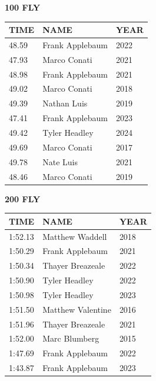 \begin{table}[H]
\centering
\begin{minipage}[t]{0.48\textwidth}
\centering
\textbf{100 FLY}\\[0.1cm]
\begin{tabular}{@{}p{1.8cm}p{2.8cm}p{1.2cm}@{}}
\hline
    \textbf{TIME} & \textbf{NAME} & \textbf{YEAR} \\
\hline
    48.59 & Frank Applebaum & 2022 \\
    47.93 & Marco Conati & 2021 \\
    48.98 & Frank Applebaum & 2021 \\
    49.02 & Marco Conati & 2018 \\
    49.39 & Nathan Luis & 2019 \\
    47.41 & Frank Applebaum & 2023 \\
    49.42 & Tyler Headley & 2024 \\
    49.69 & Marco Conati & 2017 \\
    49.78 & Nate Luis & 2021 \\
    48.46 & Marco Conati & 2019 \\
\hline
\end{tabular}
\end{minipage}\hfill
\begin{minipage}[t]{0.48\textwidth}
\centering
\textbf{200 FLY}\\[0.1cm]
\begin{tabular}{@{}p{1.8cm}p{2.8cm}p{1.2cm}@{}}
\hline
    \textbf{TIME} & \textbf{NAME} & \textbf{YEAR} \\
\hline
    1:52.13 & Matthew Waddell & 2018 \\
    1:50.29 & Frank Applebaum & 2021 \\
    1:50.34 & Thayer Breazeale & 2022 \\
    1:50.90 & Tyler Headley & 2022 \\
    1:50.98 & Tyler Headley & 2023 \\
    1:51.50 & Matthew Valentine & 2016 \\
    1:51.96 & Thayer Breazeale & 2021 \\
    1:52.00 & Marc Blumberg & 2015 \\
    1:47.69 & Frank Applebaum & 2022 \\
    1:43.87 & Frank Applebaum & 2023 \\
\hline
\end{tabular}
\end{minipage}
\end{table}

